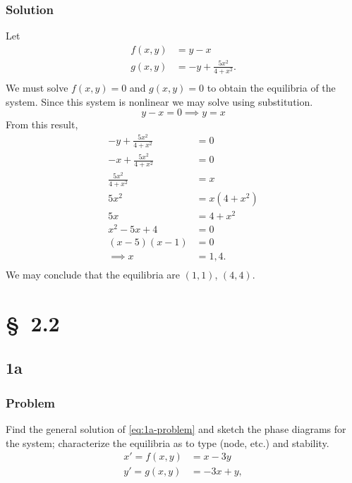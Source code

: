 \documentclass[12pt]{article}
\begin{document}
\subsubsection*{Solution}
Let
\begin{equation}
  \begin{aligned}
    f(x,y) &= y-x \\
    g(x,y) &= -y+\frac{5x^2}{4+x^2}. \\
  \end{aligned}
\end{equation}
We must solve $f(x,y)=0$ and $g(x,y)=0$ to obtain the equilibria of the system.
Since this system is nonlinear we may solve using substitution.
\begin{equation}
  y - x = 0 \implies y = x
\end{equation}
From this result,
\begin{equation}
  \begin{aligned}
    -y+\frac{5x^2}{4+x^2} &= 0 \\
    -x+\frac{5x^2}{4+x^2} &= 0 \\
    \frac{5x^2}{4+x^2} &= x \\
    5x^2 &= x(4+x^2) \\
    5x &= 4+x^2 \\
    x^2-5x+4 &= 0 \\
    (x-5)(x-1) &= 0 \\
    \implies x &= 1, 4. \\
  \end{aligned}
\end{equation}
We may conclude that the equilibria are $(1,1)$, $(4,4)$.
\section{\S~2.2}
\subsection{1a}
\subsubsection*{Problem}
Find the general solution of \cref{eq:1a-problem} and sketch the phase diagrams
for the system; characterize the equilibria as to type (node, etc.) and
stability.
\begin{equation}
  \label{eq:1a-problem}
  \begin{aligned}
    x'=f(x,y)&=x-3y\\
    y'=g(x,y)&=-3x+y,\\
  \end{aligned}
\end{equation}
\end{document}
